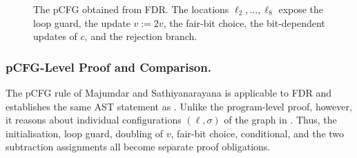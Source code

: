 \begin{figure}[t]

    \vspace{-1mm}
    \caption{The pCFG obtained from FDR. The locations
    $\ell_2,\ldots,\ell_8$ expose the loop guard, the update $v:=2v$, the
    fair-bit choice, the bit-dependent updates of $c$, and the rejection
    branch.}
    \label{fig:fdr-pcfg}
\end{figure}


\subsubsection{pCFG-Level Proof and Comparison.}
The pCFG rule of Majumdar and Sathiyanarayana is applicable to FDR and
establishes the same AST statement as .  Unlike the
program-level proof, however, it reasons about individual configurations
$(\ell,\sigma)$ of the graph in .  Thus, the initialisation,
loop guard, doubling of $v$, fair-bit choice, conditional, and the two
subtraction assignments all become separate proof obligations.

